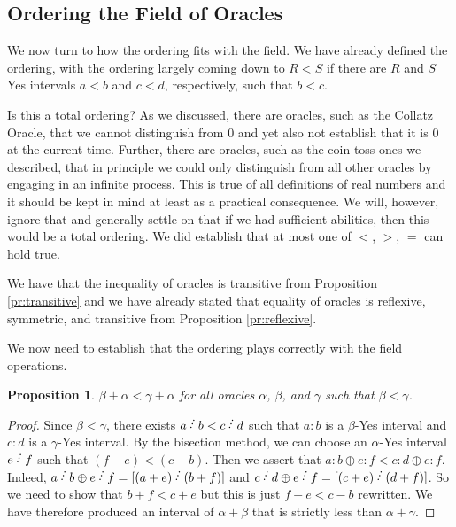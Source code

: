\documentclass[12pt]{article}
\newtheorem{proposition}{Proposition}[subsection]
\theoremstyle{remark}
\begin{document}
\subsection{Ordering the Field of Oracles}

We now turn to how the ordering fits with the field. We have already defined the ordering, with the ordering largely coming down to $R < S$ if there are $R$ and $S$ Yes intervals $a<b$ and $c<d$, respectively, such that $b<c$. 

Is this a total ordering? As we discussed, there are oracles, such as the Collatz Oracle, that we cannot distinguish from 0 and yet also not establish that it is 0 at the current time. Further, there are oracles, such as the coin toss ones we described, that in principle we could only distinguish from all other oracles by engaging in an infinite process. This is true of all definitions of real numbers and it should be kept in mind at least as a practical consequence. We will, however,  ignore that and generally settle on that if we had sufficient abilities, then this would be a total ordering. We did establish that at most one of $<$, $>$, $=$ can hold true. 

We have that the inequality of oracles is transitive from Proposition \ref{pr:transitive} and we have already stated that equality of oracles is reflexive, symmetric, and transitive from Proposition \ref{pr:reflexive}. 

We now need to establish that the ordering plays correctly with the field operations. 

\begin{proposition}\label{pr:addinq}
 $\beta + \alpha< \gamma + \alpha$ for all oracles $\alpha$, $\beta$, and $\gamma$ such that $\beta < \gamma$.
\end{proposition}

\begin{proof}
Since $\beta < \gamma$, there exists $a\lte b< c\lte d$ such that $a:b$ is a $\beta$-Yes interval and $c:d$ is a $\gamma$-Yes interval. By the bisection method, we can choose an $\alpha$-Yes interval $e\lte f$ such that $ (f-e) <  (c-b)$. Then we assert that $a:b \oplus e:f  < c:d \oplus e:f$. Indeed, $a \lte b \oplus e \lte f = [(a+e) \lte (b+f)]$ and $c \lte d \oplus e \lte f = [(c+e)\lte (d+f)]$. So we need to show that $b+f < c+e$ but this is just $f-e < c-b$ rewritten. We have therefore produced an interval of $\alpha+\beta$ that is strictly less than $\alpha+\gamma$. 
\end{proof}
\end{document}
